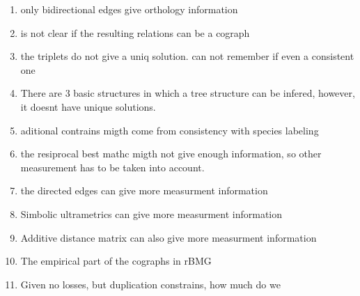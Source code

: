 \documentclass[11pt]{article}
\begin{document}
\begin{enumerate}
\item only bidirectional edges give orthology information
\item is not clear if the resulting relations can be a cograph
\item the triplets do not give a uniq solution. can not remember if even a consistent one
\item There are 3 basic structures in which a tree structure can be infered, however, it doesnt have unique solutions.
\item aditional contrains migth come from consistency with species labeling
\item the resiprocal best mathc migth not give enough information, so other measurement has to be taken into account.
\item the directed edges can give more measurment information
\item Simbolic ultrametrics can give more measurment information
\item Additive distance matrix can also give more measurment information
\item The empirical part of the cographs in rBMG 
\item Given no losses, but duplication constrains, how much do we 
\end{enumerate}


% 
\end{document}
